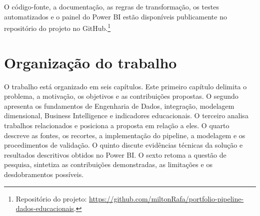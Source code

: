 O código-fonte, a documentação, as regras de transformação, os testes automatizados e o painel do Power BI estão disponíveis publicamente no repositório do projeto no GitHub.\footnote{Repositório do projeto: \url{https://github.com/miltonRafa/portfolio-pipeline-dados-educacionais}.}

\section{Organização do trabalho}

O trabalho está organizado em seis capítulos. Este primeiro capítulo delimita o problema, a motivação, os objetivos e as contribuições propostas. O segundo apresenta os fundamentos de Engenharia de Dados, integração, modelagem dimensional, Business Intelligence e indicadores educacionais. O terceiro analisa trabalhos relacionados e posiciona a proposta em relação a eles. O quarto descreve as fontes, os recortes, a implementação do pipeline, a modelagem e os procedimentos de validação. O quinto discute evidências técnicas da solução e resultados descritivos obtidos no Power BI. O sexto retoma a questão de pesquisa, sintetiza as contribuições demonstradas, as limitações e os desdobramentos possíveis.
